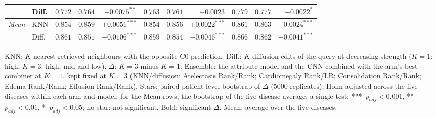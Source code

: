 \begin{table}[htbp]
\begin{threeparttable}
\begin{tabular}{ll|ccr|ccr|ccr}
 & Diff. & $0.772$ & $0.764$ & $\mathbf{-0.0075}^{**}$ & $0.763$ & $0.761$ & $-0.0023$ & $0.779$ & $0.777$ & $\mathbf{-0.0022}^{*}$ \\
\midrule
\multirow{2}{*}{\textit{Mean}} & KNN & $0.854$ & $0.859$ & $\mathbf{+0.0051}^{***}$ & $0.854$ & $0.856$ & $\mathbf{+0.0022}^{***}$ & $0.861$ & $0.863$ & $\mathbf{+0.0024}^{***}$ \\
 & Diff. & $0.861$ & $0.851$ & $\mathbf{-0.0106}^{***}$ & $0.859$ & $0.854$ & $\mathbf{-0.0046}^{***}$ & $0.866$ & $0.862$ & $\mathbf{-0.0041}^{***}$ \\
\bottomrule
\end{tabular}
\begin{tablenotes}\footnotesize
\item KNN: $K$ nearest retrieved neighbours with the opposite C0 prediction. Diff.: $K$ diffusion edits of the query at decreasing strength ($K=1$: high; $K=3$: high, mid and low). $\Delta$: $K=3$ minus $K=1$. Ensemble: the attribute model and the CNN combined with the arm's best combiner at $K=1$, kept fixed at $K=3$ (KNN/diffusion: Atelectasis Rank/Rank; Cardiomegaly Rank/LR; Consolidation Rank/Rank; Edema Rank/Rank; Effusion Rank/Rank). Stars: paired patient-level bootstrap of $\Delta$ (5000 replicates), Holm-adjusted across the five diseases within each arm and model; for the Mean rows, the bootstrap of the five-disease average, a single test; ***~$p_{adj} < 0.001$, **~$p_{adj} < 0.01$, *~$p_{adj} < 0.05$; no star: not significant. Bold: significant $\Delta$. Mean: average over the five diseases.
\end{tablenotes}
\end{threeparttable}
\end{table}

